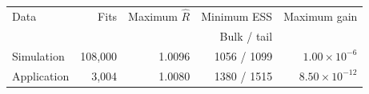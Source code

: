 \begin{tabular}{@{}lrrrr@{}}
\toprule
Data & Fits & Maximum $\widehat R$ & Minimum ESS & Maximum gain\\
 & & & Bulk / tail & \\
\midrule
Simulation & 108,000 & 1.0096 & 1056 / 1099 & $1.00\times10^{-6}$\\
Application & 3,004 & 1.0080 & 1380 / 1515 & $8.50\times10^{-12}$\\
\bottomrule
\end{tabular}
